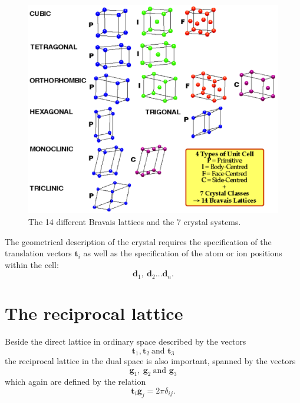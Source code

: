\documentclass[12pt,a4paper,english]{beamer}
\newcommand{\mbf}{ \mathbf }
\begin{document}
\begin{frame}
  \begin{figure}[htp]
\centering
\includegraphics[scale=0.3]{Bravais}
\caption{The 14 different Bravais lattices and the 7 crystal systems.}
\label{fig:bravais}
\end{figure}

\end{frame}

\begin{frame} 
  The geometrical description of the crystal requires the specification 
  of the translation vectors $\mbf t_i$ as well as the 
  specification of the atom or ion positions within the cell: 
  $$\mbf d_1,~\mbf d_2\dots \mbf d_n.$$  
\end{frame}
\section{The reciprocal lattice}
\begin{frame}
  Beside the direct lattice in ordinary space described by the vectors 
  $$\mbf t_1,\mbf t_2~\mbox{and }\mbf t_3$$
  the reciprocal lattice in the dual space is also important, spanned by the 
  vectors
  $$\mbf g_1,~\mbf g_2~\mbox{and }\mbf g_3$$
  which again are defined by the relation 
  $$\mbf t_i \mbf g_j=2\pi\delta_{ij}.$$

\end{frame}
\end{document}
